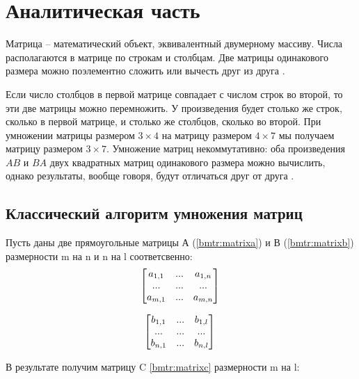 \section{Аналитическая часть}

Матрица – математический объект, эквивалентный двумерному массиву. Числа располагаются в матрице по строкам и столбцам. Две матрицы одинакового размера можно поэлементно сложить или вычесть друг из друга \cite{matr}.

Если число столбцов в первой матрице совпадает с числом строк во второй, то эти две матрицы можно перемножить. У произведения будет столько же строк, сколько в первой матрице, и столько же столбцов, сколько во второй. При умножении матрицы размером $3 \times 4$ на матрицу размером $4 \times 7$ мы получаем матрицу размером $3 \times 7$. Умножение матриц некоммутативно: оба произведения $AB$ и $BA$ двух квадратных матриц одинакового размера можно вычислить, однако результаты, вообще говоря, будут отличаться друг от друга \cite{matr}.

\subsection{Классический алгоритм умножения матриц}

Пусть даны две прямоугольные матрицы А (\ref{bmtr:matrixa}) и В (\ref{bmtr:matrixb}) размерности m на n и n на l соответсвенно: 
\begin{equation}
 \label{bmtr:matrixa}
\begin{bmatrix}
a_{1,1} & ... & a_{1,n} \\
... & ... & ... \\
a_{m,1} & ... & a_{m,n} \\
\end{bmatrix} \\
\end{equation}

\begin{equation}
 \label{bmtr:matrixb}
\begin{bmatrix}
b_{1,1} & ... & b_{1,l} \\
... & ... & ... \\
b_{n,1} & ... & b_{n,l} \\
\end{bmatrix} \\
\end{equation}

В результате получим матрицу C \ref{bmtr:matrixc} размерности m на l:
	
